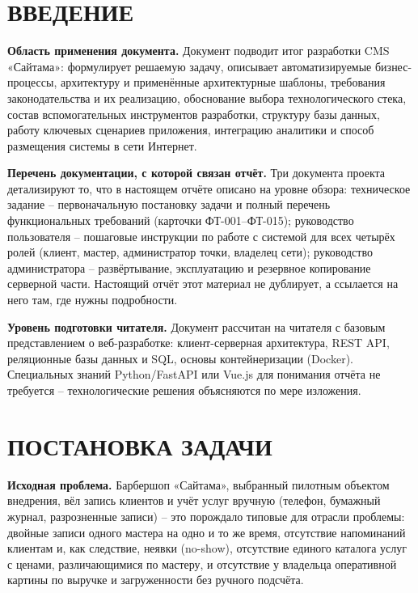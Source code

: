 \newpage
\tableofcontents
\newpage

\section*{ВВЕДЕНИЕ}

\textbf{Область применения документа.} Документ подводит итог разработки
CMS «Сайтама»: формулирует решаемую задачу, описывает автоматизируемые
бизнес-процессы, архитектуру и применённые архитектурные шаблоны,
требования законодательства и их реализацию, обоснование выбора
технологического стека, состав вспомогательных инструментов разработки,
структуру базы данных, работу ключевых сценариев приложения, интеграцию
аналитики и способ размещения системы в сети Интернет.

\textbf{Перечень документации, с которой связан отчёт.} Три документа
проекта детализируют то, что в настоящем отчёте описано на уровне обзора:
техническое задание -- первоначальную постановку задачи и полный перечень
функциональных требований (карточки ФТ-001--ФТ-015); руководство
пользователя -- пошаговые инструкции по работе с системой для всех четырёх
ролей (клиент, мастер, администратор точки, владелец сети); руководство
администратора -- развёртывание, эксплуатацию и резервное копирование
серверной части. Настоящий отчёт этот материал не дублирует, а ссылается
на него там, где нужны подробности.

\textbf{Уровень подготовки читателя.} Документ рассчитан на читателя с
базовым представлением о веб-разработке: клиент-серверная архитектура,
REST API, реляционные базы данных и SQL, основы контейнеризации (Docker).
Специальных знаний Python/FastAPI или Vue.js для понимания отчёта не
требуется -- технологические решения объясняются по мере изложения.

\section{ПОСТАНОВКА ЗАДАЧИ}

\textbf{Исходная проблема.} Барбершоп «Сайтама», выбранный пилотным
объектом внедрения, вёл запись клиентов и учёт услуг вручную (телефон,
бумажный журнал, разрозненные записи) -- это порождало типовые для отрасли
проблемы: двойные записи одного мастера на одно и то же время, отсутствие
напоминаний клиентам и, как следствие, неявки (no-show), отсутствие
единого каталога услуг с ценами, различающимися по мастеру, и отсутствие
у владельца оперативной картины по выручке и загруженности без ручного
подсчёта.

